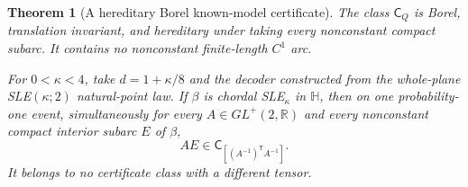 \documentclass[11pt]{article}
\newtheorem{theorem}{Theorem}[section]
\theoremstyle{definition}\newtheorem{definition}[theorem]{Definition}
\theoremstyle{remark}\newtheorem{remark}[theorem]{Remark}
\begin{document}
\begin{theorem}[A hereditary Borel known-model certificate]
\label{thm:hereditary-cluster-certificate}
The class $\mathsf C_Q$ is Borel, translation invariant, and hereditary
under taking every nonconstant compact subarc. It contains no
nonconstant finite-length $C^1$ arc.

For $0<\kappa<4$, take $d=1+\kappa/8$ and the decoder constructed
from the whole-plane SLE$(\kappa;2)$ natural-point law. If $\beta$ is
chordal SLE$_\kappa$ in $\mathbb H$, then on one probability-one
event, simultaneously for every $A\in GL^+(2,\mathbb R)$ and every
nonconstant compact interior subarc $E$ of $\beta$,
\[
       AE\in\mathsf C_{[(A^{-1})^{\mathsf T}A^{-1}]}.
       \tag{HC3}
\]
It belongs to no certificate class with a different tensor.
\end{theorem}
\end{document}

